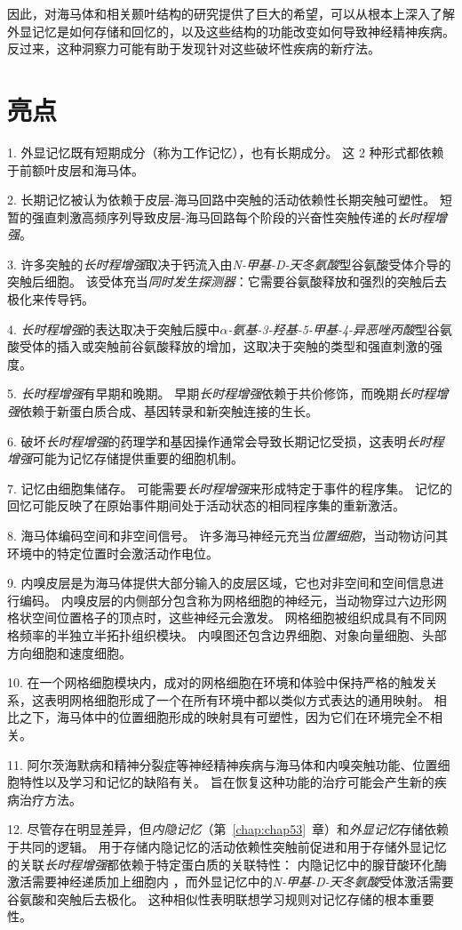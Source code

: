 因此，对海马体和相关颞叶结构的研究提供了巨大的希望，可以从根本上深入了解外显记忆是如何存储和回忆的，以及这些结构的功能改变如何导致神经精神疾病。
反过来，这种洞察力可能有助于发现针对这些破坏性疾病的新疗法。



\section{亮点}

1. 外显记忆既有短期成分（称为工作记忆），也有长期成分。
这 2 种形式都依赖于前额叶皮层和海马体。


2. 长期记忆被认为依赖于皮层-海马回路中突触的活动依赖性长期突触可塑性。
短暂的强直刺激高频序列导致皮层-海马回路每个阶段的兴奋性突触传递的\textit{长时程增强}。


3. 许多突触的\textit{长时程增强}取决于钙流入由\textit{N-甲基-D-天冬氨酸}型谷氨酸受体介导的突触后细胞。
该受体充当\textit{同时发生探测器}：它需要谷氨酸释放和强烈的突触后去极化来传导钙。 


4. \textit{长时程增强}的表达取决于突触后膜中\textit{$\alpha$-氨基-3-羟基-5-甲基-4-异恶唑丙酸}型谷氨酸受体的插入或突触前谷氨酸释放的增加，这取决于突触的类型和强直刺激的强度。


5. \textit{长时程增强}有早期和晚期。
早期\textit{长时程增强}依赖于共价修饰，而晚期\textit{长时程增强}依赖于新蛋白质合成、基因转录和新突触连接的生长。


6. 破坏\textit{长时程增强}的药理学和基因操作通常会导致长期记忆受损，这表明\textit{长时程增强}可能为记忆存储提供重要的细胞机制。


7. 记忆由细胞集储存。
可能需要\textit{长时程增强}来形成特定于事件的程序集。
记忆的回忆可能反映了在原始事件期间处于活动状态的相同程序集的重新激活。


8. 海马体编码空间和非空间信号。
许多海马神经元充当\textit{位置细胞}，当动物访问其环境中的特定位置时会激活动作电位。


9. 内嗅皮层是为海马体提供大部分输入的皮层区域，它也对非空间和空间信息进行编码。
内嗅皮层的内侧部分包含称为网格细胞的神经元，当动物穿过六边形网格状空间位置格子的顶点时，这些神经元会激发。
网格细胞被组织成具有不同网格频率的半独立半拓扑组织模块。
内嗅图还包含边界细胞、对象向量细胞、头部方向细胞和速度细胞。


10. 在一个网格细胞模块内，成对的网格细胞在环境和体验中保持严格的触发关系，这表明网格细胞形成了一个在所有环境中都以类似方式表达的通用映射。
相比之下，海马体中的位置细胞形成的映射具有可塑性，因为它们在环境完全不相关。


11. 阿尔茨海默病和精神分裂症等神经精神疾病与海马体和内嗅突触功能、位置细胞特性以及学习和记忆的缺陷有关。
旨在恢复这种功能的治疗可能会产生新的疾病治疗方法。 


12. 尽管存在明显差异，但\textit{内隐记忆}（第~\ref{chap:chap53}~章）和\textit{外显记忆}存储依赖于共同的逻辑。
用于存储内隐记忆的活动依赖性突触前促进和用于存储外显记忆的关联\textit{长时程增强}都依赖于特定蛋白质的关联特性：
内隐记忆中的腺苷酸环化酶激活需要神经递质加上细胞内 ，而外显记忆中的\textit{N-甲基-D-天冬氨酸}受体激活需要谷氨酸和突触后去极化。
这种相似性表明联想学习规则对记忆存储的根本重要性。






